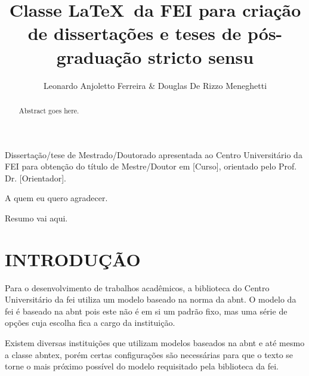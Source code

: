\documentclass{fei}
\author{Leonardo Anjoletto Ferreira \& Douglas De Rizzo Meneghetti}
\title{Classe \LaTeX~da FEI para criação de dissertações e teses de pós-graduação stricto sensu}
\begin{document}

\maketitle

\begin{folhaderosto}
Dissertação/tese de Mestrado/Doutorado apresentada ao Centro Universitário da FEI para obtenção do título de Mestre/Doutor em [Curso], orientado pelo Prof. Dr. [Orientador].
\end{folhaderosto}

\begin{agradecimentos}
A quem eu quero agradecer.
\end{agradecimentos}

\begin{resumo}
Resumo vai aqui. 
\end{resumo}

\begin{abstract}
Abstract goes here.
\end{abstract}

\tabelas
\listofalgorithms
\printglossaries
\sumario

\chapter{INTRODUÇÃO}

Para o desenvolvimento de trabalhos acadêmicos, a biblioteca do Centro Universitário da \gls{fei} utiliza um modelo baseado na norma da \gls{abnt}. O modelo da \gls{fei} é baseado na \gls{abnt} pois este não é em si um padrão fixo, mas uma série de opções cuja escolha fica a cargo da instituição.

Existem diversas instituições que utilizam modelos baseados na \gls{abnt} e até mesmo a classe \gls{abntex}, porém certas configurações são necessárias para que o texto se torne o mais próximo possível do modelo requisitado pela biblioteca da \gls{fei}.
\end{document}
